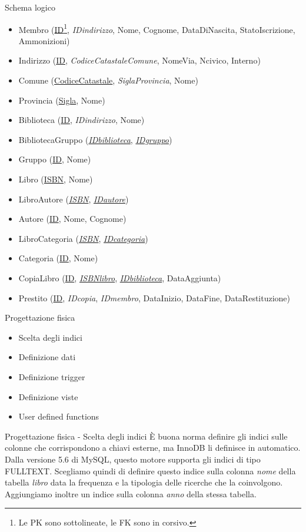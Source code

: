 \begin{frame}{Schema logico}
    \scriptsize
    \begin{itemize}
        \item Membro (\ul{ID}\footnote{Le PK sono sottolineate, le FK sono in corsivo.}, \textit{IDindirizzo}, Nome, Cognome, DataDiNascita, StatoIscrizione, Ammonizioni)
        \item Indirizzo (\ul{ID}, \textit{CodiceCatastaleComune}, NomeVia, Ncivico, Interno)
        \item Comune (\ul{CodiceCatastale}, \textit{SiglaProvincia}, Nome)
        \item Provincia (\ul{Sigla}, Nome)
        \item Biblioteca (\ul{ID}, \textit{IDindirizzo}, Nome)
        \item BibliotecaGruppo (\ul{\textit{IDbiblioteca}}, \ul{\textit{IDgruppo}})
        \item Gruppo (\ul{ID}, Nome)
        \item Libro (\ul{ISBN}, Nome)
        \item LibroAutore (\ul{\textit{ISBN}}, \ul{\textit{IDautore}})
        \item Autore (\ul{ID}, Nome, Cognome)
        \item LibroCategoria (\ul{\textit{ISBN}}, \ul{\textit{IDcategoria}})
        \item Categoria (\ul{ID}, Nome)
        \item CopiaLibro (\ul{ID}, \ul{\textit{ISBNlibro}}, \ul{\textit{IDbiblioteca}}, DataAggiunta)
        \item Prestito (\ul{ID}, \textit{IDcopia}, \textit{IDmembro}, DataInizio, DataFine, DataRestituzione)
    \end{itemize}
\end{frame}

\begin{frame}{Progettazione fisica}
    \begin{itemize}
        \item Scelta degli indici
        \item Definizione dati
        \item Definizione trigger
        \item Definizione viste
        \item User defined functions
    \end{itemize}
\end{frame}

\begin{frame}{Progettazione fisica - Scelta degli indici}
    È buona norma definire gli indici sulle colonne che corrispondono a chiavi esterne, ma InnoDB li definisce in automatico.\\

    Dalla versione 5.6 di MySQL, questo motore supporta gli indici di tipo FULLTEXT. Scegliamo quindi di definire questo indice sulla colonna \textit{nome} della tabella \textit{libro} data la frequenza e la tipologia delle ricerche che la coinvolgono.\\

    Aggiungiamo inoltre un indice sulla colonna \textit{anno} della stessa tabella.
\end{frame}

